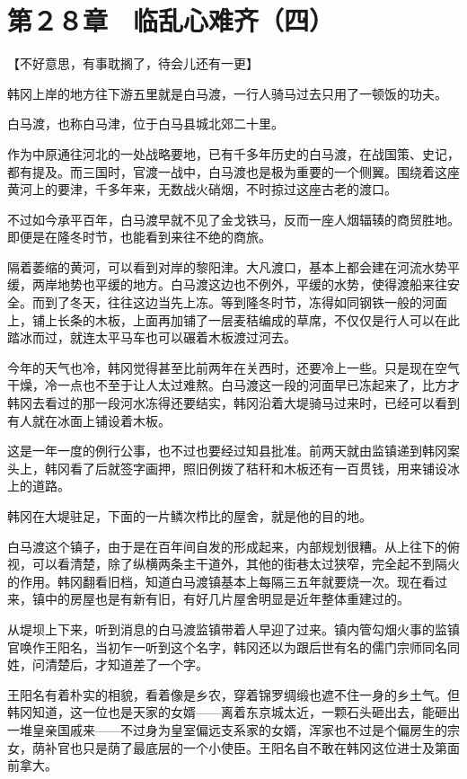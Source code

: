 \section{第２８章　临乱心难齐（四）}

【不好意思，有事耽搁了，待会儿还有一更】

韩冈上岸的地方往下游五里就是白马渡，一行人骑马过去只用了一顿饭的功夫。

白马渡，也称白马津，位于白马县城北郊二十里。

作为中原通往河北的一处战略要地，已有千多年历史的白马渡，在战国策、史记，都有提及。而三国时，官渡一战中，白马渡也是极为重要的一个侧翼。围绕着这座黄河上的要津，千多年来，无数战火硝烟，不时掠过这座古老的渡口。

不过如今承平百年，白马渡早就不见了金戈铁马，反而一座人烟辐辏的商贸胜地。即便是在隆冬时节，也能看到来往不绝的商旅。

隔着萎缩的黄河，可以看到对岸的黎阳津。大凡渡口，基本上都会建在河流水势平缓，两岸地势也平缓的地方。白马渡这边也不例外，平缓的水势，使得渡船来往安全。而到了冬天，往往这边当先上冻。等到隆冬时节，冻得如同钢铁一般的河面上，铺上长条的木板，上面再加铺了一层麦秸编成的草席，不仅仅是行人可以在此踏冰而过，就连太平马车也可以碾着木板渡过河去。

今年的天气也冷，韩冈觉得甚至比前两年在关西时，还要冷上一些。只是现在空气干燥，冷一点也不至于让人太过难熬。白马渡这一段的河面早已冻起来了，比方才韩冈去看过的那一段河水冻得还要结实，韩冈沿着大堤骑马过来时，已经可以看到有人就在冰面上铺设着木板。

这是一年一度的例行公事，也不过也要经过知县批准。前两天就由监镇递到韩冈案头上，韩冈看了后就签字画押，照旧例拨了秸秆和木板还有一百贯钱，用来铺设冰上的道路。

韩冈在大堤驻足，下面的一片鳞次栉比的屋舍，就是他的目的地。

白马渡这个镇子，由于是在百年间自发的形成起来，内部规划很糟。从上往下的俯视，可以看清楚，除了纵横两条主干道外，其他的街巷太过狭窄，完全起不到隔火的作用。韩冈翻看旧档，知道白马渡镇基本上每隔三五年就要烧一次。现在看过来，镇中的房屋也是有新有旧，有好几片屋舍明显是近年整体重建过的。

从堤坝上下来，听到消息的白马渡监镇带着人早迎了过来。镇内管勾烟火事的监镇官唤作王阳名，当初乍一听到这个名字，韩冈还以为跟后世有名的儒门宗师同名同姓，问清楚后，才知道差了一个字。

王阳名有着朴实的相貌，看着像是乡农，穿着锦罗绸缎也遮不住一身的乡土气。但韩冈知道，这一位也是天家的女婿——离着东京城太近，一颗石头砸出去，能砸出一堆皇亲国戚来——不过身为皇室偏远支系家的女婿，浑家也不过是个偏房生的宗女，荫补官也只是荫了最底层的一个小使臣。王阳名自不敢在韩冈这位进士及第面前拿大。

